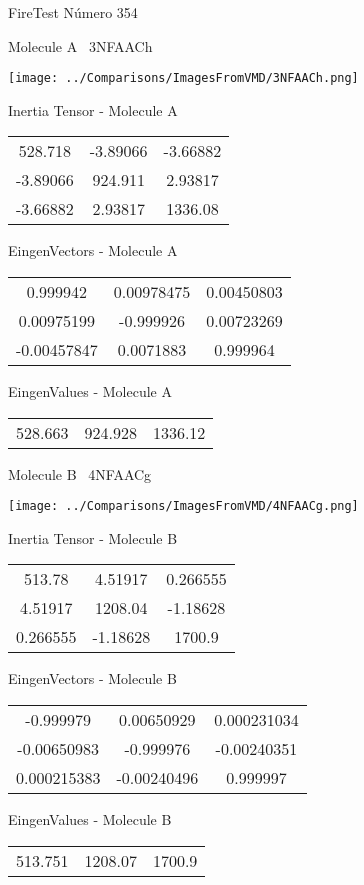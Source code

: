 \vtab[-3cm]
\begin{center}
{\large FireTest \tab Número 354}
\end{center}
\begin{multicols}{2}
\begin{center}

Molecule A \
3NFAACh

\texttt{[image: ../Comparisons/ImagesFromVMD/3NFAACh.png]}

Inertia Tensor - Molecule A \\
\begin{tabular}{|c c c|}
528.718	 & 	-3.89066	 & 	-3.66882	 \\
-3.89066	 & 	924.911	 & 	2.93817	 \\
-3.66882	 & 	2.93817	 & 	1336.08
\end{tabular}

\vtab
 EingenVectors - Molecule A     \\
\begin{tabular}{|c c c|}
0.999942	 & 	0.00978475	 & 	0.00450803	 \\
0.00975199	 & 	-0.999926	 & 	0.00723269	 \\
-0.00457847	 & 	0.0071883	 & 	0.999964
\end{tabular}

\vtab
 EingenValues - Molecule A     \\
\begin{tabular}{|c c c|}
528.663	 & 	924.928	 & 	1336.12	 \\
\end{tabular}
\columnbreak

Molecule B \
4NFAACg

\texttt{[image: ../Comparisons/ImagesFromVMD/4NFAACg.png]}

Inertia Tensor - Molecule B \\
\begin{tabular}{|c c c|}
513.78	 & 	4.51917	 & 	0.266555	 \\
4.51917	 & 	1208.04	 & 	-1.18628	 \\
0.266555	 & 	-1.18628	 & 	1700.9
\end{tabular}

\vtab
 EingenVectors - Molecule B     \\
\begin{tabular}{|c c c|}
-0.999979	 & 	0.00650929	 & 	0.000231034	 \\
-0.00650983	 & 	-0.999976	 & 	-0.00240351	 \\
0.000215383	 & 	-0.00240496	 & 	0.999997
\end{tabular}

\vtab
 EingenValues - Molecule B     \\
\begin{tabular}{|c c c|}
513.751	 & 	1208.07	 & 	1700.9	 \\
\end{tabular}

\end{center}
\end{multicols}

